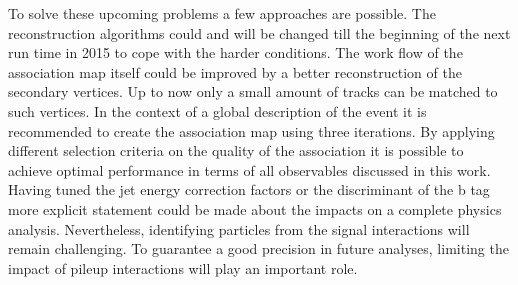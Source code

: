 To solve these upcoming problems a few approaches are possible. The reconstruction algorithms could and will be changed till the beginning of the next run time in 2015 to cope with the harder conditions. The work flow of the association map itself could be improved by a better reconstruction of the secondary vertices. Up to now only a small amount of tracks can be matched to such vertices.
In the context of a global description of the event it is recommended to create the association map using three iterations. By applying different selection criteria on the quality of the association it is possible to achieve optimal performance in terms of all observables discussed in this work. Having tuned the jet energy correction factors or the discriminant of the b tag more explicit statement could be made about the impacts on a complete physics analysis.
Nevertheless, identifying particles from the signal interactions will remain challenging. To guarantee a good precision in future analyses, limiting the impact of pileup interactions will play an important role.
